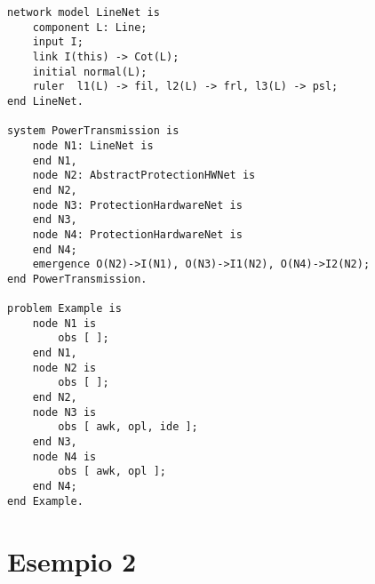 \begin{verbatim}
network model LineNet is
	component L: Line;
	input I;
	link I(this) -> Cot(L);
	initial normal(L);
	ruler  l1(L) -> fil, l2(L) -> frl, l3(L) -> psl;
end LineNet.

system PowerTransmission is
	node N1: LineNet is
	end N1,
	node N2: AbstractProtectionHWNet is
	end N2,
	node N3: ProtectionHardwareNet is
	end N3,
	node N4: ProtectionHardwareNet is
	end N4;
	emergence O(N2)->I(N1), O(N3)->I1(N2), O(N4)->I2(N2);
end PowerTransmission.

problem Example is
	node N1 is
		obs [ ];
	end N1,
	node N2 is
		obs [ ];
	end N2,
	node N3 is
		obs [ awk, opl, ide ];
	end N3,
	node N4 is
		obs [ awk, opl ];
	end N4;
end Example.
\end{verbatim}

\newpage
\section{Esempio 2}
